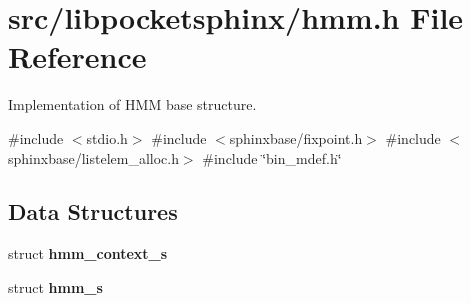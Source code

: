 \section{src/libpocketsphinx/hmm.h \-File \-Reference}
\label{hmm_8h}


\-Implementation of \-H\-M\-M base structure.  


{\ttfamily \#include $<$stdio.\-h$>$}\*
{\ttfamily \#include $<$sphinxbase/fixpoint.\-h$>$}\*
{\ttfamily \#include $<$sphinxbase/listelem\-\_\-alloc.\-h$>$}\*
{\ttfamily \#include \char`\"{}bin\-\_\-mdef.\-h\char`\"{}}\*
\subsection*{\-Data \-Structures}
\begin{DoxyCompactItemize}
\item 
struct {\bf hmm\-\_\-context\-\_\-s}
\item 
struct {\bf hmm\-\_\-s}
\end{DoxyCompactItemize}
